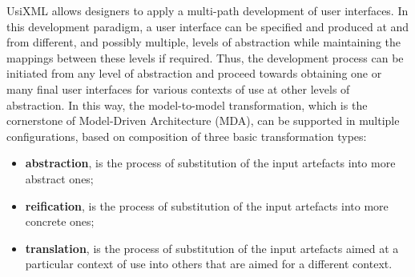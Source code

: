 UsiXML allows designers to apply a multi-path development of user interfaces. In this development paradigm, a user interface can be specified and produced at and from different, and possibly multiple, levels of abstraction while maintaining the mappings between these levels if required. Thus, the development process can be initiated from any level of abstraction and proceed towards obtaining one or many final user interfaces for various contexts of use at other levels of abstraction. In this way, the model-to-model transformation, which is the cornerstone of Model-Driven Architecture (MDA), can be supported in multiple configurations, based on composition of three basic transformation types\cite{UsiXML_a_Language_Supporting_Multi-Path_Development_of_User_Interfaces}:
\begin{itemize}
\item \textbf{abstraction}, is the process of substitution of the input artefacts into more abstract ones;
\item \textbf{reification}, is the process of substitution of the input artefacts into more concrete ones;
\item \textbf{translation}, is the process of substitution of the input artefacts aimed at a particular context of use into others that are aimed for a different context.
\end{itemize} 



